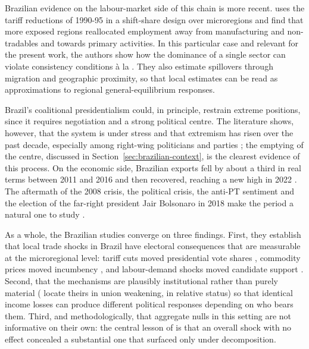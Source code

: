 \documentclass[
	11pt,				%
	oneside,			%
	a4paper,			%
	english,			%
	english				%
	]{abntex2ppgsi}
\theoremstyle{plain}
\theoremstyle{remark}
\theoremstyle{plain}%
\theoremstyle{remark}%
\begin{document}
Brazilian evidence on the labour-market side of this chain is more recent.  uses the tariff reductions of 1990-95 in a shift-share design over microregions and find that more exposed regions reallocated employment away from manufacturing and non-tradables and towards primary activities. In this particular case and relevant for the present work, the authors show how the dominance of a single sector can violate consistency conditions à la . They also estimate spillovers through migration and geographic proximity, so that local estimates can be read as approximations to regional general-equilibrium responses.

Brazil's coalitional presidentialism could, in principle, restrain extreme positions, since it requires negotiation and a strong political centre. The literature shows, however, that the system is under stress and that extremism has risen over the past decade, especially among right-wing politicians and parties \cite{ZUCCO}; the emptying of the centre, discussed in Section~\ref{sec:brazilian-context}, is the clearest evidence of this process. On the economic side, Brazilian exports fell by about a third in real terms between 2011 and 2016 and then recovered, reaching a new high in 2022 \cite{cooney}. The aftermath of the 2008 crisis, the political crisis, the anti-PT sentiment and the election of the far-right president Jair Bolsonaro in 2018 make the period a natural one to study \cite{hunter, status}.

As a whole, the Brazilian studies converge on three findings. First, they establish that local trade shocks in Brazil have
electoral consequences that are measurable at the microregional level: tariff cuts moved presidential vote shares \cite{Ogeda}, commodity prices moved
incumbency \cite{Novaes}, and labour-demand shocks moved candidate support \cite{barros}. Second, that the mechanisms are plausibly institutional rather
than purely material ( locate theirs in union weakening,
 in relative status) so that identical income losses can produce different political responses depending on who bears them. 
Third, and methodologically, that aggregate nulls in this setting are not informative on their own: the central lesson of  is that an overall shock with no effect concealed a substantial one that surfaced only under decomposition.
\end{document}

